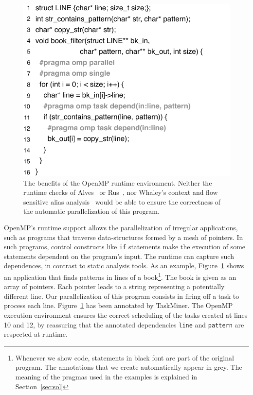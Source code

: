 \documentclass[sigplan,10pt,screen]{acmart}
\newcommand\Taskminer{\mbox{\textsf{TaskMiner}}}
\begin{document}
\begin{figure}[t!]
\begin{center}
\includegraphics[width=1\columnwidth]{images/ex_book_filter}
\caption{The benefits of the OpenMP runtime environment.
Neither the runtime checks of Alves~\cite{Alves15} or Rus~\cite{Rus02}, nor
Whaley's context and flow sensitive alias analysis~\cite{Whaley04} would be able to ensure the
correctness of the automatic parallelization of this program.}
\label{fig:ex_book_filter}
\end{center}
\end{figure}

OpenMP's runtime support allows the parallelization of irregular applications,
such as programs that traverse data-structures formed by a mesh of pointers.
In such programs, control constructs like {\tt if} statements make the
execution of some statements dependent on the program's input.
The runtime can capture such dependences, in contrast to static analysis tools.
As an example, Figure~\ref{fig:ex_book_filter} shows an application that
finds patterns in lines of a book\footnote{Whenever we show code, statements in
black font are part of the original program.
The annotations that we create automatically appear in grey.
The meaning of the pragmas used in the examples is explained in
Section~\ref{sec:sol}}.
The book is given as an array of pointers.
Each pointer leads to a string representing a potentially different line.
Our parallelization of this program consists in firing off a task
to process each line.
Figure~\ref{fig:ex_book_filter} has been annotated by
\Taskminer.
The OpenMP execution environment ensures the correct scheduling of the tasks
created at lines 10 and 12, by reassuring that the annotated dependencies
{\tt line} and {\tt pattern}
are respected at runtime.
\end{document}
